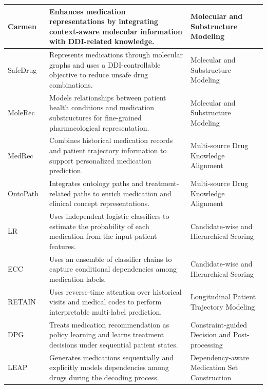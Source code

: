 \documentclass[manuscript,review]{acmart}
\begin{document}
\begin{longtable}{
    @{}
    L{0.13\textwidth}
    L{0.54\textwidth}
    L{0.27\textwidth}
    @{}
}
Carmen~\cite{chen2023carmen} &
Enhances medication representations by integrating context-aware molecular information with DDI-related knowledge. &
Molecular and Substructure Modeling \\
\hline

SafeDrug~\cite{yang2021safedrug} &
Represents medications through molecular graphs and uses a DDI-controllable objective to reduce unsafe drug combinations. &
Molecular and Substructure Modeling \\
\hline

MoleRec~\cite{yang2023molerec} &
Models relationships between patient health conditions and medication substructures for fine-grained pharmacological representation. &
Molecular and Substructure Modeling \\
\hline

MedRec~\cite{zhang2023medrec} &
Combines historical medication records and patient trajectory information to support personalized medication prediction. &
Multi-source Drug Knowledge Alignment \\
\hline

OntoPath~\cite{yao2023ontopath} &
Integrates ontology paths and treatment-related paths to enrich medication and clinical concept representations. &
Multi-source Drug Knowledge Alignment \\
\hline

LR~\cite{luaces2012binary} &
Uses independent logistic classifiers to estimate the probability of each medication from the input patient features. &
Candidate-wise and Hierarchical Scoring \\
\hline

ECC~\cite{read2011classifier} &
Uses an ensemble of classifier chains to capture conditional dependencies among medication labels. &
Candidate-wise and Hierarchical Scoring \\
\hline

RETAIN~\cite{choi2016retain} &
Uses reverse-time attention over historical visits and medical codes to perform interpretable multi-label prediction. &
Longitudinal Patient Trajectory Modeling \\
\hline

DPG~\cite{zheng2023dpg} &
Treats medication recommendation as policy learning and learns treatment decisions under sequential patient states. &
Constraint-guided Decision and Post-processing \\
\hline

LEAP~\cite{zhang2017leap} &
Generates medications sequentially and explicitly models dependencies among drugs during the decoding process. &
Dependency-aware Medication Set Construction \\
\hline


\end{longtable}
\end{document}
